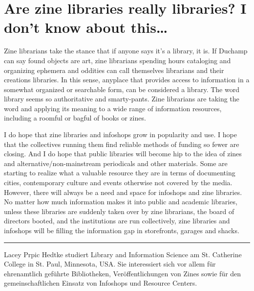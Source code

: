 \documentclass[output=paper]{langscibook}
\begin{document}
\hypertarget{are-zine-libraries-really-libraries-i-dont-know-about-this}{%
\section*{Are zine libraries really libraries? I don't know about
this\ldots{}}\label{are-zine-libraries-really-libraries-i-dont-know-about-this}}

Zine librarians take the stance that if anyone says it's a library, it
is. If Duchamp can say found objects are art, zine librarians spending
hours cataloging and organizing ephemera and oddities can call
themselves librarians and their creations libraries. In this sense,
anyplace that provides access to information in a somewhat organized or
searchable form, can be considered a library. The word library seems so
authoritative and smarty-pants. Zine librarians are taking the word and
applying its meaning to a wide range of information resources, including
a roomful or bagful of books or zines.

I do hope that zine libraries and infoshops grow in popularity and use.
I hope that the collectives running them find reliable methods of
funding so fewer are closing. And I do hope that public libraries will
become hip to the idea of zines and alternative/non-mainstream
periodicals and other materials. Some are starting to realize what a
valuable resource they are in terms of documenting cities, contemporary
culture and events otherwise not covered by the media. However, there
will always be a need and space for infoshops and zine libraries. No
matter how much information makes it into public and academic libraries,
unless these libraries are suddenly taken over by zine librarians, the
board of directors booted, and the institutions are run collectively,
zine libraries and infoshops will be filling the information gap in
storefronts, garages and shacks.

\begin{center}\rule{0.5\linewidth}{0.5pt}\end{center}

Lacey Prpic Hedtke studiert Library and Information Science am St. Catherine College in St. Paul, Minnesota, USA. Sie interessiert sich vor allem für ehrenamtlich geführte Bibliotheken, Veröffentlichungen von Zines sowie für den gemeinschaftlichen Einsatz von Infoshops und Resource Centers.
\end{document}

